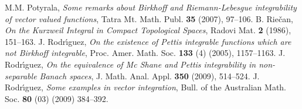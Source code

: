 \documentclass[11pt,a4paper,twoside]{amsart}
\begin{document}
\begin{thebibliography}{99}
 M.M.  Potyrala,   \textit{Some remarks about Birkhoff and Riemann-Lebesgue integrability of vector valued functions}, Tatra Mt. Math. Publ. {\bf 35} (2007), 97--106.
 B. Rie\v{c}an,  \textit{ On the Kurzweil Integral in Compact Topological Spaces}, Radovi Mat. {\bf 2} (1986), 151--163.
 J. Rodr\'{\i}guez, {\em On the existence of Pettis integrable functions which are not
Birkhoff integrable}, Proc. Amer. Math. Soc. {\bf 133} (4) (2005),  1157--1163.
 J. Rodr\'{\i}guez, {\em On the equivalence of Mc Shane and Pettis integrability
in non-separable Banach spaces}, J. Math. Anal. Appl. {\bf 350} (2009), 514--524.
 J. Rodr\'{\i}guez, {\em Some examples in vector integration}, Bull. of the Australian Math. Soc. {\bf 80} (03) (2009) 384--392. 
\end{thebibliography}
\end{document}
